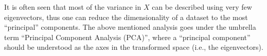 It is often seen that most of the variance in $X$ can be described using very few eigenvectors, thus one can reduce the dimensionality of a dataset to the most ``principal'' components.
The above mentioned analysis goes under the umbrella term ``Principal Component Analysis (PCA)'', where a ``principal component'' should be understood as the axes in the transformed space (i.e., the eigenvectors). 
